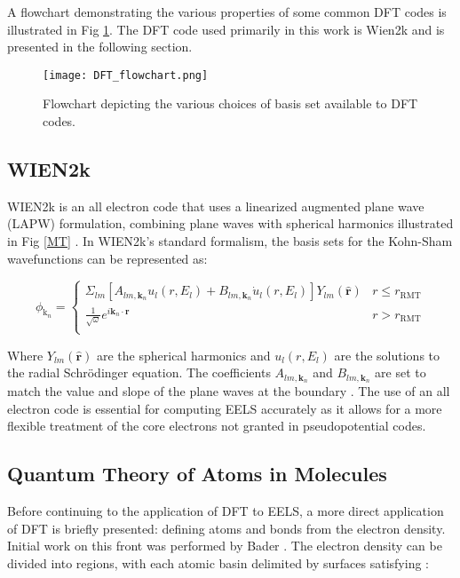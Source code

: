  A flowchart demonstrating the various properties of some common DFT codes is illustrated in Fig \ref{dft-flowchart}.  The DFT code used primarily in this work is Wien2k and is presented in the following section.

\begin{figure}
	\centering
	\texttt{[image: DFT\_flowchart.png]}
	\caption{Flowchart depicting the various choices of basis set available to DFT codes.}
	\label{dft-flowchart}
\end{figure}


\subsection{WIEN2k}
WIEN2k is an all electron code that uses a linearized augmented plane wave (LAPW) formulation, combining plane waves with spherical harmonics illustrated in Fig \ref{MT} \cite{wien2k}.   In WIEN2k's standard formalism, the basis sets for the Kohn-Sham wavefunctions can be represented as: 

\begin{equation}
	\phi_{\mathrm{k}_n} = 
	\begin{cases}
	\Sigma_{lm} [A_{lm,\textbf{k}_n}u_l(r,E_l) + B_{lm,\textbf{k}_n}\dot{u}_l(r,E_l)]Y_{lm}(\hat{\textbf{r}}) & r \leq r_{\mathrm{RMT}} \\
	\frac{1}{\sqrt{\omega}}e^{i\textbf{k}_n \cdot \textbf{r}} & r> r_{\mathrm{RMT}} \\
	\end{cases}
\end{equation}

Where $Y_{lm}(\hat{\textbf{r}})$ are the spherical harmonics and $u_l(r,E_l)$ are the solutions to the radial Schr\"odinger equation.  The coefficients $A_{lm,\textbf{k}_n}$ and $B_{lm,\textbf{k}_n}$ are set to match the value and slope of the plane waves at the boundary \cite{wien2k}.  The use of an all electron code is essential for computing EELS accurately as it allows for a more flexible treatment of the core electrons not granted in pseudopotential codes. 
 


\subsection{Quantum Theory of Atoms in Molecules} \label{bader-theory}
Before continuing to the application of DFT to EELS,  a more direct application of DFT is briefly presented: defining atoms and bonds from the electron density. Initial work on this front was performed by Bader \cite{bader}. The electron density can be divided into regions, with each atomic basin  delimited by surfaces satisfying \cite{bader_quantum_1991}: 


